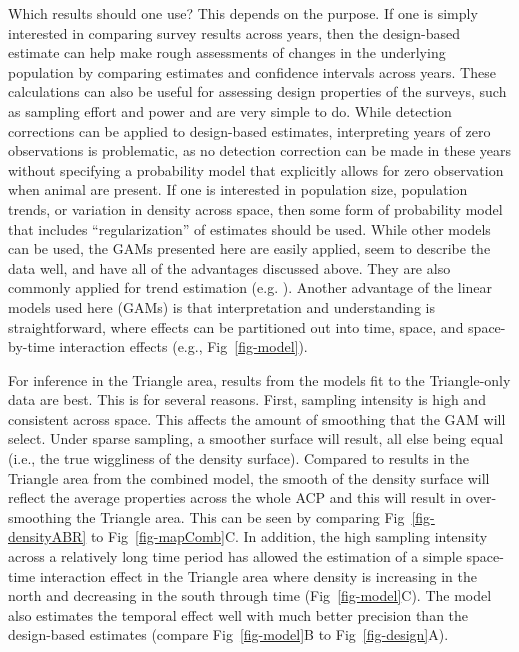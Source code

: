 \documentclass[
  10pt,
  letterpaper,
]{article}
\begin{document}
Which results should one use? This depends on the purpose. If one is
simply interested in comparing survey results across years, then the
design-based estimate can help make rough assessments of changes in the
underlying population by comparing estimates and confidence intervals
across years. These calculations can also be useful for assessing design
properties of the surveys, such as sampling effort and power and are
very simple to do. While detection corrections can be applied to
design-based estimates, interpreting years of zero observations is
problematic, as no detection correction can be made in these years
without specifying a probability model that explicitly allows for zero
observation when animal are present. If one is interested in population
size, population trends, or variation in density across space, then
some form of probability model that includes ``regularization'' of
estimates should be used. While other models can be used, the GAMs
presented here are easily applied, seem to describe the data well, and
have all of the advantages discussed above. They are also commonly
applied for trend estimation (e.g. \citep{amundson2019, rosenberg2019decline, smith2021north}). Another advantage of the linear models used here (GAMs) is that interpretation and understanding is straightforward, where effects can be partitioned out into time, space, and space-by-time interaction effects (e.g.,
Fig~\ref{fig-model}).

For inference in the Triangle area, results from the models fit to the
Triangle-only data are best. This is for several reasons. First,
sampling intensity is high and consistent across space. This affects the
amount of smoothing that the GAM will select. Under sparse sampling, a
smoother surface will result, all else being equal (i.e., the true
wiggliness of the density surface). Compared to results in the Triangle
area from the combined model, the smooth of the density surface will
reflect the average properties across the whole ACP and this will result
in over-smoothing the Triangle area. This can be seen by comparing
Fig~\ref{fig-densityABR} to Fig~\ref{fig-mapComb}C. In addition, the
high sampling intensity across a relatively long time period has allowed
the estimation of a simple space-time interaction effect in the Triangle
area where density is increasing in the north and decreasing in the
south through time (Fig~\ref{fig-model}C). The model also estimates the
temporal effect well with much better precision than the design-based
estimates (compare Fig~\ref{fig-model}B to Fig~\ref{fig-design}A).
\end{document}
